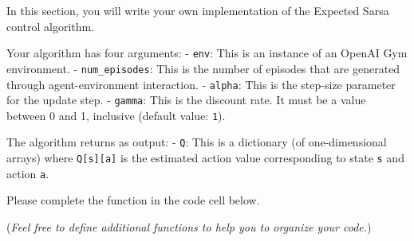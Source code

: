 \documentclass[11pt]{article}
\begin{document}
In this section, you will write your own implementation of the Expected
Sarsa control algorithm.

Your algorithm has four arguments: - \texttt{env}: This is an instance
of an OpenAI Gym environment. - \texttt{num\_episodes}: This is the
number of episodes that are generated through agent-environment
interaction. - \texttt{alpha}: This is the step-size parameter for the
update step. - \texttt{gamma}: This is the discount rate. It must be a
value between 0 and 1, inclusive (default value: \texttt{1}).

The algorithm returns as output: - \texttt{Q}: This is a dictionary (of
one-dimensional arrays) where \texttt{Q{[}s{]}{[}a{]}} is the estimated
action value corresponding to state \texttt{s} and action \texttt{a}.

Please complete the function in the code cell below.

(\emph{Feel free to define additional functions to help you to organize
your code.})
\end{document}
